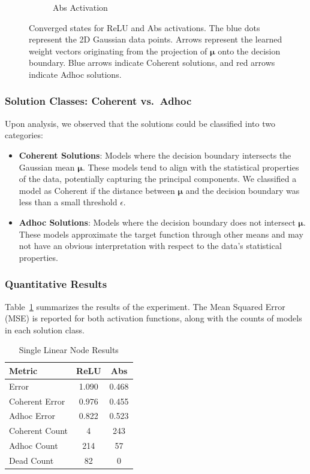 \begin{figure}[h]
\begin{subfigure}[b]{0.48\textwidth}
        \caption{Abs Activation}
        \label{fig:converged_abs}
    \end{subfigure}    
    \caption{Converged states for ReLU and Abs activations. The blue dots represent the 2D Gaussian data points. Arrows represent the learned weight vectors originating from the projection of $\boldsymbol{\mu}$ onto the decision boundary. Blue arrows indicate Coherent solutions, and red arrows indicate Adhoc solutions.}
    \label{fig:converged_states}
\end{figure}
    
\subsubsection{Solution Classes: Coherent vs.\ Adhoc}

Upon analysis, we observed that the solutions could be classified into two categories:

\begin{itemize} 
    \item \textbf{Coherent Solutions}: Models where the decision boundary intersects the Gaussian mean $\boldsymbol{\mu}$. These models tend to align with the statistical properties of the data, potentially capturing the principal components. We classified a model as Coherent if the distance between $\boldsymbol{\mu}$ and the decision boundary was less than a small threshold $\epsilon$.
    
    \item \textbf{Adhoc Solutions}: Models where the decision boundary does not intersect $\boldsymbol{\mu}$. These models approximate the target function through other means and may not have an obvious interpretation with respect to the data's statistical properties.
\end{itemize}

\subsubsection{Quantitative Results}

Table~\ref{tab:ex1_stats} summarizes the results of the experiment. The Mean Squared Error (MSE) is reported for both activation functions, along with the counts of models in each solution class.

\begin{table}[h]
    \centering
    \caption{Single Linear Node Results}
    \label{tab:ex1_stats}
    \begin{tabular}{|l|c|c|}
    \hline
    Metric & ReLU & Abs \\
    \hline
    Error & 1.090 & 0.468 \\
    Coherent Error & 0.976 & 0.455 \\
    Adhoc Error & 0.822 & 0.523 \\
    Coherent Count & 4 & 243 \\
    Adhoc Count & 214 & 57 \\
    Dead Count & 82 & 0 \\
    \hline
    \end{tabular}
    \end{table}

